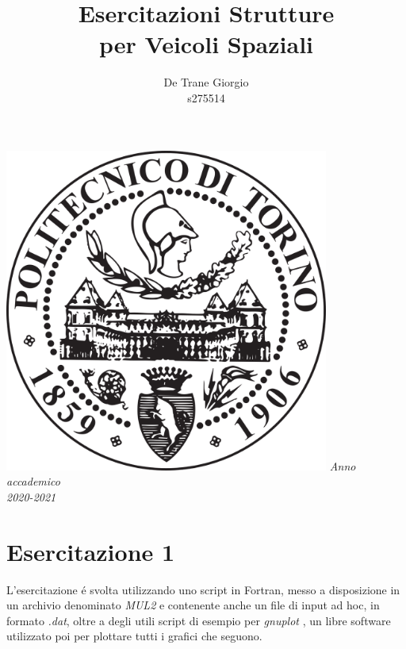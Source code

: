 \documentclass{article}
\author{De Trane Giorgio\\s275514}
\title{\textbf{Esercitazioni Strutture\\per Veicoli Spaziali}}
\begin{document}
    \maketitle
    \begin{center}
        \includegraphics[width=0.8\textwidth]{polito_logo.png}
        \linebreak
        \linebreak
        \textit{Anno accademico\\2020-2021}
    \end{center}
    \pagebreak
    \section{Esercitazione 1}
    L'esercitazione é svolta utilizzando uno script in Fortran, messo a disposizione
    in un archivio denominato \textit{MUL2} \autocite*{MUL2} e contenente anche un file di input ad hoc, in formato \textit{.dat},
    oltre a degli utili script di esempio per \textit{gnuplot} \autocite*{gnuplot}, un libre software utilizzato poi per plottare tutti i grafici che seguono.
\end{document}
